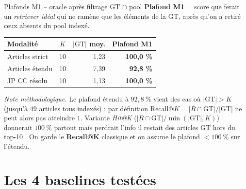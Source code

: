 \documentclass[aspectratio=169,10pt]{beamer}
\begin{document}
\begin{frame}{Plafonds M1 -- oracle après filtrage GT $\cap$ pool}
  \scriptsize
  \textbf{Plafond M1} = score que ferait un \emph{retriever idéal} qui ne ramène que les éléments de la GT,
  après qu'on a retiré ceux absents du pool indexé.

  \vspace{0.5em}
  \begin{center}
  \renewcommand{\arraystretch}{1.2}
  \setlength{\tabcolsep}{8pt}
  \begin{tabular}{@{}l c r r@{}}
    \toprule
    \textbf{Modalité} & $K$ & $|\mathrm{GT}|$ moy. & \textbf{Plafond M1} \\
    \midrule
    Articles strict  & 10 & 1,23 & \textbf{100,0 \%} \\
    Articles étendu  & 10 & 7,39 & \textbf{92,8 \%} \\
    JP CC résolu     & 10 & 1,13 & \textbf{100,0 \%} \\
    \bottomrule
  \end{tabular}
  \end{center}

  \vspace{0.5em}
  \begin{flushleft}
  \tiny\textit{Note méthodologique.} Le plafond étendu à $92{,}8~\%$ vient des cas où $|\mathrm{GT}| > K$
  (jusqu'à $49$ articles tous indexés) : par définition $\mathrm{Recall@}K = |R \cap \mathrm{GT}| / |\mathrm{GT}|$
  ne peut alors pas atteindre $1$. Variante \emph{Hit@K} ($|R \cap \mathrm{GT}| / \min(|\mathrm{GT}|, K)$) donnerait
  $100~\%$ partout mais perdrait l'info \og il restait des articles GT hors du top-10 \fg{}. On garde le
  \textbf{Recall@K} classique et on assume le plafond $<100~\%$ sur l'étendu.
  \end{flushleft}
\end{frame}

\section{Les 4 baselines testées}
\end{document}
